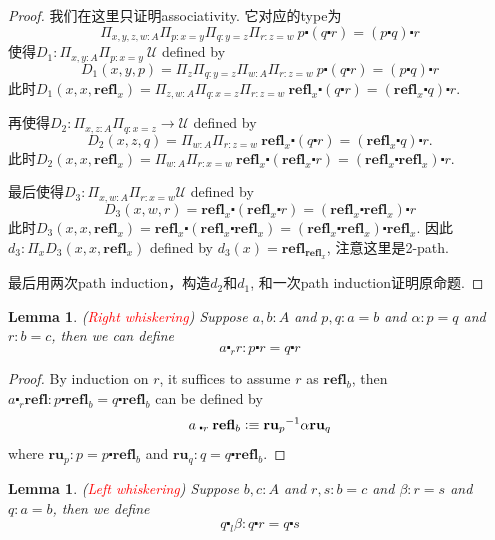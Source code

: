 \documentclass{article}
\newtheorem{lemma}[theorem]{Lemma}
\newcommand{\redt}[1]{\textcolor{red}{#1}}
\newcommand{\defeqv}{\vcentcolon\equiv}
\newcommand{\refl}{\textbf{refl}}
\begin{document}
\begin{proof}
我们在这里只证明associativity.  它对应的type为
\[
    \Pi_{x,y,z,w : A} \Pi_{p : x=y} \Pi_{q : y = z} \Pi_{r : z = w} ~ p \centerdot (q \centerdot r) = (p \centerdot q) \centerdot r
\]
使得$D_1 : \Pi_{x,y : A} \Pi_{p : x=y}~\mathcal{U}$ defined by 
\[
    D_1(x,y,p) =\Pi_{z}\Pi_{q : y=z}\Pi_{w : A} \Pi_{r : z = w} ~ p \centerdot (q \centerdot r) = (p \centerdot q) \centerdot r
\]
此时$D_1(x,x,\refl_x) = \Pi_{z, w : A}\Pi_{q : x = z}\Pi_{r : z = w}~\refl_x \centerdot (q \centerdot r) = (\refl_x \centerdot q) \centerdot r$.

再使得$D_2 : \Pi_{x, z : A} \Pi_{q : x=z} \to \mathcal{U}$ defined by 
\[
    D_2(x,z,q) = \Pi_{w : A}\Pi_{r : z = w} ~\refl_x \centerdot (q \centerdot r) = (\refl_x \centerdot q) \centerdot r.
\]
此时$D_2(x,x,\refl_x) = \Pi_{w : A}\Pi_{r : x = w } ~\refl_x \centerdot (\refl_x \centerdot r) = (\refl_x \centerdot \refl_x) \centerdot r$.

最后使得$D_3 : \Pi_{x, w : A} \Pi_{r : x = w } \mathcal{U}$ defined by
\[
    D_3(x, w, r) = \refl_x \centerdot (\refl_x \centerdot r) = (\refl_x \centerdot \refl_x) \centerdot r
\]
此时$D_3(x,x,\refl_x) = \refl_x \centerdot (\refl_x \centerdot \refl_x) = (\refl_x \centerdot \refl_x) \centerdot \refl_x$. 因此$d_3 : \Pi_{x} D_3(x,x,\refl_x)$ defined by $d_3(x) = \refl_{\refl_x}$, 注意这里是2-path.

最后用两次path induction，构造$d_2$和$d_1$, 和一次path induction证明原命题. 
\end{proof}

\begin{lemma}
\rm (\redt{Right whiskering}) Suppose $a, b : A$ and $p, q : a = b$ and $\alpha : p = q$ and $r : b = c$, then we can define
\[
    a \centerdot_r r : p \centerdot r = q \centerdot r
\]
\end{lemma}

\begin{proof}
By induction on $r$, it suffices to assume $r$ as $\refl_b$, then $a \centerdot_r \refl : p \centerdot \refl_b = q \centerdot \refl_b$ can be defined by
\[
    a \centerdot_r \refl_b \defeqv {\textbf{ru}_p}^{-1} \alpha \textbf{ru}_q 
\]
where $\textbf{ru}_p : p = p \centerdot \refl_b$ and $\textbf{ru}_q : q = q \centerdot \refl_b$. 
\end{proof}

\begin{lemma}
\rm (\redt{Left whiskering}) Suppose $b, c : A$ and $r, s : b = c$ and $\beta : r = s$ and $q : a = b$, then we define
\[
    q \centerdot_l \beta : q \centerdot r = q \centerdot s
\]
\end{lemma}
\end{document}
